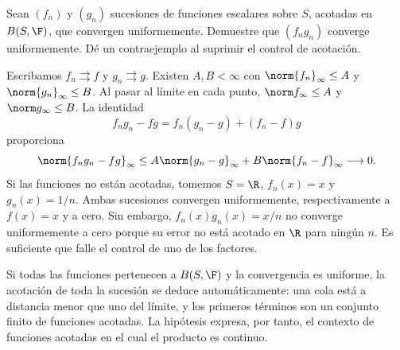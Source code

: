\begin{ejercicio}\label{ej:lectura-26-2}
Sean $(f_n)$ y $(g_n)$ sucesiones de funciones escalares sobre $S$, acotadas en $B(S,\F)$, que convergen uniformemente. Demuestre que $(f_ng_n)$ converge uniformemente. Dé un contraejemplo al suprimir el control de acotación.
\end{ejercicio}
\begin{solucion}
Escribamos $f_n\rightrightarrows f$ y $g_n\rightrightarrows g$. Existen $A,B<\infty$ con $\norm{f_n}_\infty\le A$ y $\norm{g_n}_\infty\le B$. Al pasar al límite en cada punto, $\norm f_\infty\le A$ y $\norm g_\infty\le B$. La identidad
\[
 f_ng_n-fg=f_n(g_n-g)+(f_n-f)g
\]
proporciona
\[
 \norm{f_ng_n-fg}_\infty
 \le A\norm{g_n-g}_\infty+B\norm{f_n-f}_\infty\longrightarrow0.
\]
Si las funciones no están acotadas, tomemos $S=\R$, $f_n(x)=x$ y $g_n(x)=1/n$. Ambas sucesiones convergen uniformemente, respectivamente a $f(x)=x$ y a cero. Sin embargo, $f_n(x)g_n(x)=x/n$ no converge uniformemente a cero porque su error no está acotado en $\R$ para ningún $n$. Es suficiente que falle el control de uno de los factores.

Si todas las funciones pertenecen a $B(S,\F)$ y la convergencia es uniforme, la acotación de toda la sucesión se deduce automáticamente: una cola está a distancia menor que uno del límite, y los primeros términos son un conjunto finito de funciones acotadas. La hipótesis expresa, por tanto, el contexto de funciones acotadas en el cual el producto es continuo.
\end{solucion}

